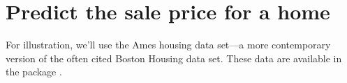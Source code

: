 \section{Predict the sale price for a home}

For illustration, we'll use the Ames housing data set---a more contemporary version of the often cited Boston Housing data set. These data are available in the  package
\citep{AmesHousing-pkg}. %

